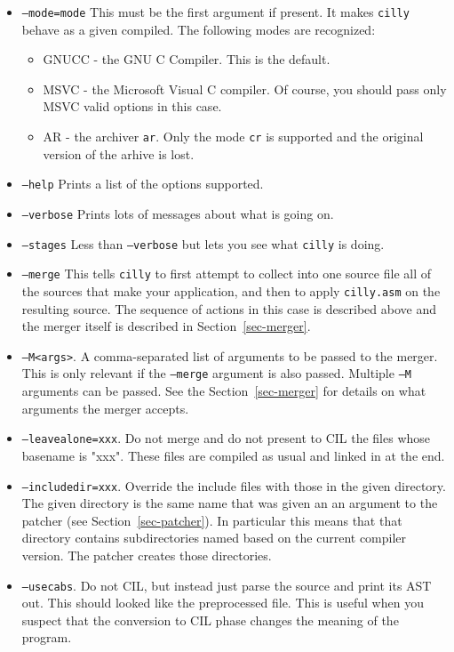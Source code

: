 \documentclass{article}
\def\secref#1{Section~\ref{sec-#1}}
\def\t#1{{\tt #1}}
\begin{document}
\begin{itemize}
\item \t{--mode=mode} This must be the first argument if present. It makes
\t{cilly} behave as a given compiled. The following modes are recognized: 
     \begin{itemize}
        \item GNUCC - the GNU C Compiler. This is the default.
        \item MSVC - the Microsoft Visual C compiler. Of course, you should
                     pass only MSVC valid options in this case. 
        \item AR - the archiver \t{ar}. Only the mode \t{cr} is supported and
                   the original version of the arhive is lost. 
     \end{itemize}
\item \t{--help} Prints a list of the options supported.
\item \t{--verbose} Prints lots of messages about what is going on.
\item \t{--stages} Less than \t{--verbose} but lets you see what \t{cilly}
                   is doing. 
\item \t{--merge} This tells \t{cilly} to first attempt to collect into one
source file all of the sources that make your application, and then to apply
\t{cilly.asm} on the resulting source. The sequence of actions in this case is
described above and the merger itself is described in \secref{merger}.
\item \t{--M<args>}. A comma-separated list of arguments to be passed to the
merger. This is only relevant if the \t{--merge} argument is also passed.
Multiple \t{--M} arguments can be passed. See the \secref{merger} for details
on what arguments the merger accepts. 

\item \t{--leavealone=xxx}. Do not merge and do not present to CIL the files
whose basename is "xxx". These files are compiled as usual and linked in at
the end. 
\item \t{--includedir=xxx}. Override the include files with those in the given
directory. The given directory is the same name that was given an an argument
to the patcher (see \secref{patcher}). In particular this means that
that directory contains subdirectories named based on the current compiler
version. The patcher creates those directories. 
\item \t{--usecabs}. Do not CIL, but instead just parse the source and print
its AST out. This should looked like the preprocessed file. This is useful
when you suspect that the conversion to CIL phase changes the meaning of the
program. 
\end{itemize}
 
\end{document}
